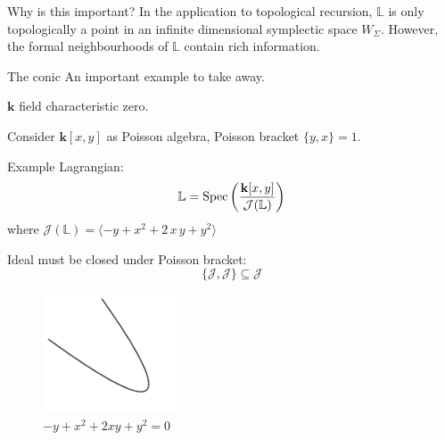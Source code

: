     \begin{frame}{Why is this important?}
    In the application to topological recursion, \( \mathbb{L}\) is only topologically a point in an infinite dimensional symplectic space \(W_\Sigma\). However, the formal neighbourhoods of \( \mathbb{L}\) contain rich information.
    \end{frame}
    
    
    
    
    
    
    
    
    
    
    
    \begin{frame}{The conic}
    An important example to take away.
    
     \( \mathbf{k}\) field characteristic zero.
    
    \vspace{1em}
    \begin{ex}
    Consider \( \mathbf{k}[x,y]\) as Poisson algebra, Poisson bracket \( \{y,x\}=1\).
    
    Example Lagrangian:
    \[\mathbb{L} = \mathrm{Spec} \left( \frac{\mathbf{k}[x,y]} {  \mathcal{J}(\mathbb{L})} \right) \]
    where 
    \(  \mathcal{J}(\mathbb{L}) = \langle -y +  x^2 + 2 \,x\, y + y^2\rangle\)
    \end{ex} 
    Ideal must be closed under Poisson bracket: 
    \[ \{ \mathcal{J}, \mathcal{J} \}  \subseteq \mathcal{J} \]
    \end{frame} 
    
    

    
    
    \begin{frame} 
    \begin{figure}
    \includegraphics[width=4cm]{sections/out.pdf}
    \caption{\(-y+x^2+2 xy+y^2=0\)}
    \end{figure}    
    \end{frame} 
    
